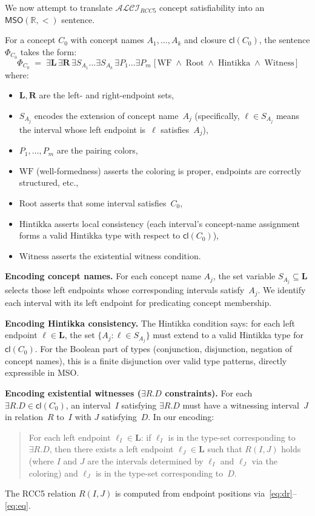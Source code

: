 \documentclass[a4paper,11pt]{article}
\theoremstyle{definition}
\newcommand{\ALCIRCC}[1]{\ensuremath{\mathcal{ALCI}_{\mathit{RCC#1}}}}
\newcommand{\cl}{\ensuremath{\mathsf{cl}}}
\newcommand{\MSO}{\ensuremath{\mathsf{MSO}}}
\newcommand{\reals}{\ensuremath{\mathbb{R}}}
\begin{document}
We now attempt to translate $\ALCIRCC{5}$ concept satisfiability
into an $\MSO(\reals, <)$ sentence.

For a concept $C_0$ with concept names $A_1, \ldots, A_k$ and
closure $\cl(C_0)$, the sentence $\Phi_{C_0}$ takes the form:
\[
  \Phi_{C_0} \;=\; \exists \mathbf{L}\, \exists \mathbf{R}\,
  \exists S_{A_1} \ldots \exists S_{A_k}\,
  \exists P_1 \ldots \exists P_m\;
  \bigl[\,\mathrm{WF} \;\land\; \mathrm{Root} \;\land\;
  \mathrm{Hintikka} \;\land\; \mathrm{Witness}\,\bigr]
\]
where:
\begin{itemize}[nosep]
  \item $\mathbf{L}, \mathbf{R}$ are the left- and right-endpoint
    sets,
  \item $S_{A_j}$ encodes the extension of concept name~$A_j$
    (specifically, $\ell \in S_{A_j}$ means the interval whose left
    endpoint is~$\ell$ satisfies~$A_j$),
  \item $P_1, \ldots, P_m$ are the pairing colors,
  \item $\mathrm{WF}$ (well-formedness) asserts the coloring is
    proper, endpoints are correctly structured, etc.,
  \item $\mathrm{Root}$ asserts that some interval satisfies~$C_0$,
  \item $\mathrm{Hintikka}$ asserts local consistency
    (each interval's concept-name assignment forms a valid Hintikka
    type with respect to $\cl(C_0)$),
  \item $\mathrm{Witness}$ asserts the existential witness condition.
\end{itemize}

\medskip
\noindent\textbf{Encoding concept names.}\;
For each concept name $A_j$, the set variable $S_{A_j} \subseteq
\mathbf{L}$ selects those left endpoints whose corresponding
intervals satisfy~$A_j$.  We identify each interval with its left
endpoint for predicating concept membership.

\medskip
\noindent\textbf{Encoding Hintikka consistency.}\;
The Hintikka condition says: for each left endpoint
$\ell \in \mathbf{L}$, the set
$\{A_j : \ell \in S_{A_j}\}$ must extend to a valid Hintikka type
for $\cl(C_0)$.  For the Boolean part of types (conjunction, disjunction,
negation of concept names), this is a finite disjunction over
valid type patterns, directly expressible in MSO.

\medskip
\noindent\textbf{Encoding existential witnesses ($\exists R.D$ constraints).}\;
For each $\exists R.D \in \cl(C_0)$, an interval~$I$ satisfying
$\exists R.D$ must have a witnessing interval~$J$ in relation~$R$
to~$I$ with $J$ satisfying~$D$.  In our encoding:
\begin{quote}
For each left endpoint $\ell_I \in \mathbf{L}$: if $\ell_I$
is in the type-set corresponding to $\exists R.D$, then there
exists a left endpoint $\ell_J \in \mathbf{L}$ such that $R(I, J)$
holds (where $I$ and $J$ are the intervals determined by $\ell_I$
and $\ell_J$ via the coloring) and $\ell_J$ is in the type-set
corresponding to~$D$.
\end{quote}
The RCC5 relation $R(I, J)$ is computed from endpoint positions
via~\eqref{eq:dr}--\eqref{eq:eq}.
\end{document}
